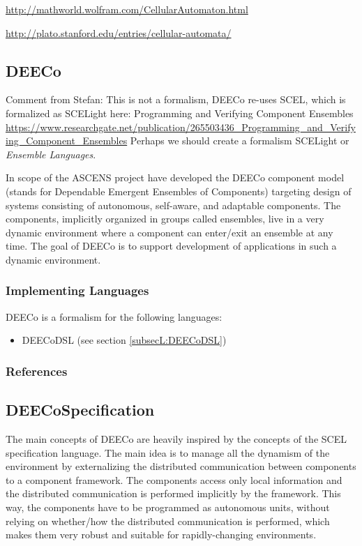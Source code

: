 \url{http://mathworld.wolfram.com/CellularAutomaton.html}
	
\url{http://plato.stanford.edu/entries/cellular-automata/}



\subsection{DEECo}
\label{subsecF:DEECo}

Comment from Stefan: This is not a formalism, DEECo re-uses SCEL, which is formalized as SCELight here:
Programming and Verifying Component Ensembles \url{https://www.researchgate.net/publication/265503436_Programming_and_Verifying_Component_Ensembles}
Perhaps we should create a formalism SCELight or \textit{Ensemble Languages}.



In scope of the ASCENS project have developed the DEECo component model (stands for Dependable Emergent Ensembles of Components) targeting design of systems consisting of autonomous, self-aware, and adaptable components. The components, implicitly organized in groups called ensembles, live in a very dynamic environment where a component can enter/exit an ensemble at any time. The goal of DEECo is to support development of applications in such a dynamic environment.

\subsubsection{Implementing Languages}

DEECo is a formalism for the following languages:
\begin{itemize}
	\item DEECoDSL (see section \ref{subsecL:DEECoDSL})
\end{itemize}


\subsubsection{References}





\subsection{DEECoSpecification}
\label{subsecF:DEECoSpecification}

The main concepts of DEECo are heavily inspired by the concepts of the SCEL specification language. The main idea is to manage all the dynamism of the environment by externalizing the distributed communication between components to a component framework. The components access only local information and the distributed communication is performed implicitly by the framework. This way, the components have to be programmed as autonomous units, without relying on whether/how the distributed communication is performed, which makes them very robust and suitable for rapidly-changing environments.

